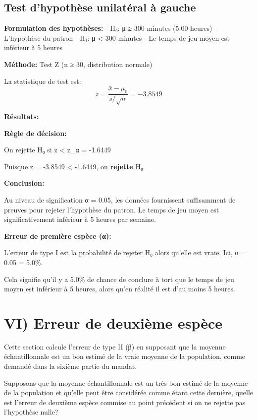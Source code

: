     \subsection{Test d'hypothèse unilatéral à
gauche}\label{test-dhypothuxe8se-unilatuxe9ral-uxe0-gauche}

\textbf{Formulation des hypothèses:} - H₀: μ ≥ 300 minutes (5.00 heures)
- L'hypothèse du patron - H₁: μ \textless{} 300 minutes - Le temps de
jeu moyen est inférieur à 5 heures

\textbf{Méthode:} Test Z (n ≥ 30, distribution normale)

La statistique de test est: \[
z = \frac{\bar{x} - \mu_0}{s / \sqrt{n}} = -3.8549
\]

\textbf{Résultats:}

\textbf{Règle de décision:}

On rejette H₀ si z \textless{} z\_α = -1.6449

Puisque z = -3.8549 \textless{} -1.6449, on \textbf{rejette} H₀.

\textbf{Conclusion:}

Au niveau de signification α = 0.05, les données fournissent
suffisamment de preuves pour rejeter l'hypothèse du patron. Le temps de
jeu moyen est significativement inférieur à 5 heures par semaine.

\textbf{Erreur de première espèce (α):}

L'erreur de type I est la probabilité de rejeter H₀ alors qu'elle est
vraie. Ici, α = 0.05 = 5.0\%.

Cela signifie qu'il y a 5.0\% de chance de conclure à tort que le temps
de jeu moyen est inférieur à 5 heures, alors qu'en réalité il est d'au
moins 5 heures.



    \section{VI) Erreur de deuxième
espèce}\label{vi-erreur-de-deuxiuxe8me-espuxe8ce}

Cette section calcule l'erreur de type II (β) en supposant que la
moyenne échantillonnale est un bon estimé de la vraie moyenne de la
population, comme demandé dans la sixième partie du mandat.

Supposons que la moyenne échantillonnale est un très bon estimé de la
moyenne de la population et qu'elle peut être considérée comme étant
cette dernière, quelle est l'erreur de deuxième espèce commise au point
précédent si on ne rejette pas l'hypothèse nulle?

